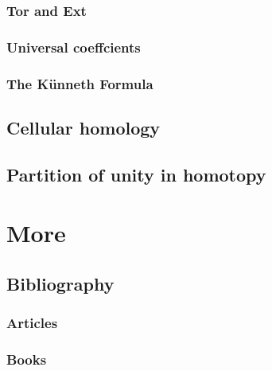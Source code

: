 \documentclass[11pt]{book} %
\begin{document}
\section{Tor and Ext}
\section{Universal coeffcients}
\section{The K\"unneth Formula}
\chapter{Cellular homology}
\chapter{Partition of unity in homotopy}
\part{More}


\chapter*{Bibliography}


\section*{Articles}
\printbibliography[heading=bibempty,type=article]


\section*{Books}
\printbibliography[heading=bibempty,type=book]


\cleardoublepage
{}
\setlength{\columnsep}{0.75cm}
\printindex

\end{document}
